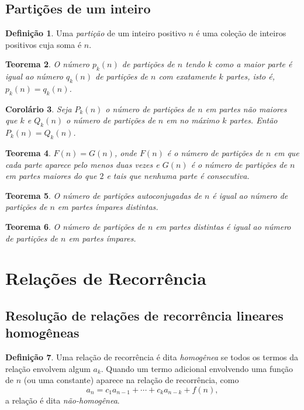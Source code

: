 \documentclass{article}
\theoremstyle{plain}
\newtheorem{thm}{Teorema}[section]
\newtheorem{cor}[thm]{Corolário}
\theoremstyle{definition}
\newtheorem{defn}[thm]{Definição}
\theoremstyle{remark}
\begin{document}
\subsection{Partições de um inteiro}

\begin{defn}
    Uma \emph{partição} de um inteiro positivo \(n\) é uma coleção de inteiros positivos cuja soma é \(n\).
\end{defn}

\begin{thm} 
    O número \(p_k(n)\) de partições de \(n\) tendo \(k\) como a maior parte é igual ao número \(q_k(n)\) de partições de \(n\) com exatamente \(k\) partes, isto é, \(p_k(n) = q_k(n)\).
\end{thm}

\begin{cor}
    Seja \(P_k(n)\) o número de partições de \(n\) em partes não maiores que \(k\) e \(Q_k(n)\) o número de partições de \(n\) em no máximo \(k\) partes. Então \(P_k(n) = Q_k(n)\).
\end{cor}

\begin{thm}
    \(F(n) = G(n)\), onde \(F(n)\) é o número de partições de \(n\) em que cada parte aparece pelo menos duas vezes e \(G(n)\) é o número de partições de \(n\) em partes maiores do que \(2\) e tais que nenhuma parte é consecutiva.
\end{thm}

\begin{thm}
    O número de partições autoconjugadas de \(n\) é igual ao número de partições de \(n\) em partes ímpares distintas.
\end{thm}

\begin{thm}
    O número de partições de \(n\) em partes distintas é igual ao número de partições de \(n\) em partes ímpares.
\end{thm}

\section{Relações de Recorrência}

\subsection{Resolução de relações de recorrência lineares homogêneas}

\begin{defn}
    Uma relação de recorrência é dita \emph{homogênea} se todos os termos da relação envolvem algum \(a_k\). Quando um termo adicional envolvendo uma função de \(n\) (ou uma constante) aparece na relação de recorrência, como 
    \begin{equation}
        a_n = c_1 a_{n-1} + \cdots + c_k a_{n-k} + f(n),
    \end{equation}
    \noindent a relação é dita \emph{não-homogênea}.
\end{defn}
\end{document}
